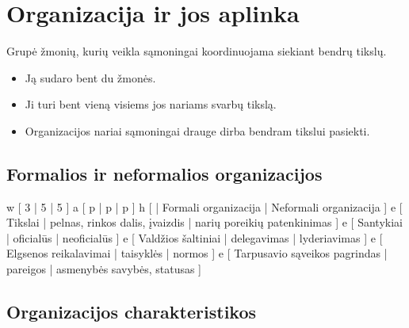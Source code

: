 \chapter{Organizacija ir jos aplinka}

\begin{defn}[Organizacija]
  Grupė žmonių, kurių veikla sąmoningai koordinuojama siekiant bendrų
  tikslų.

  \begin{itemize}
    \item Ją sudaro bent du žmonės.
    \item Ji turi bent vieną visiems jos nariams svarbų tikslą.
    \item Organizacijos nariai sąmoningai drauge dirba bendram tikslui
      pasiekti.
  \end{itemize}
\end{defn}

\section{Formalios ir neformalios organizacijos}

\xtable
{
  w [ 3 | 5 | 5 ]
  a [ p | p | p ]
  h [ | Formali organizacija | Neformali organizacija ]
  e [
    Tikslai | pelnas, rinkos dalis, įvaizdis |
    narių poreikių patenkinimas
    ]
  e [
    Santykiai | oficialūs | neoficialūs
    ]
  e [
    Valdžios šaltiniai | delegavimas | lyderiavimas
    ]
  e [
    Elgsenos reikalavimai | taisyklės | normos
    ]
  e [
    Tarpusavio sąveikos pagrindas | pareigos | asmenybės savybės, statusas
    ]
}


\section{Organizacijos charakteristikos}

